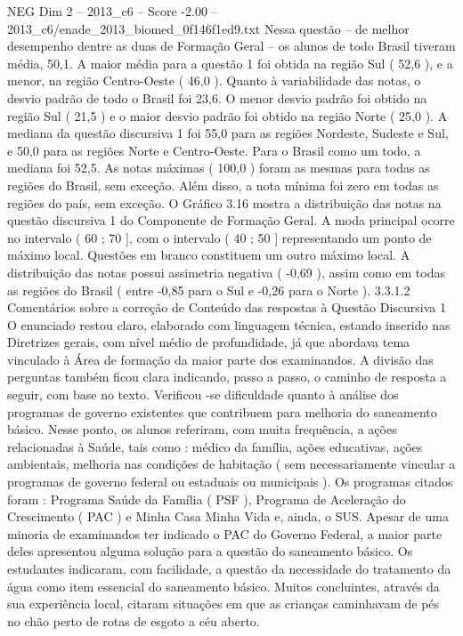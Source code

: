 \begin{textsample}{NEG Dim 2 – 2013\_c6 – Score -2.00 – 2013\_c6/enade\_2013\_biomed\_0f146f1ed9.txt}
Nessa questão – de melhor desempenho dentre as duas de Formação Geral – os alunos de todo Brasil tiveram média, 50,1.
A maior média para a questão 1 foi obtida na região Sul ( 52,6 ), e a menor, na região Centro-Oeste ( 46,0 ).
Quanto à variabilidade das notas, o desvio padrão de todo o Brasil foi 23,6.
O menor desvio padrão foi obtido na região Sul ( 21,5 ) e o maior desvio padrão foi obtido na região Norte ( 25,0 ).
A mediana da questão discursiva 1 foi 55,0 para as regiões Nordeste, Sudeste e Sul, e 50,0 para as regiões Norte e Centro-Oeste.
Para o Brasil como um todo, a mediana foi 52,5.
As notas máximas ( 100,0 ) foram as mesmas para todas as regiões do Brasil, sem exceção.
Além disso, a nota mínima foi zero em todas as regiões do país, sem exceção.
O Gráfico 3.16 mostra a distribuição das notas na questão discursiva 1 do Componente de Formação Geral.
A moda principal ocorre no intervalo ( 60 ; 70 ], com o intervalo ( 40 ; 50 ] representando um ponto de máximo local.
Questões em branco constituem um outro máximo local.
A distribuição das notas possui assimetria negativa ( -0,69 ), assim como em todas as regiões do Brasil ( entre -0,85 para o Sul e -0,26 para o Norte ). 3.3.1.2 Comentários sobre a correção de Conteúdo das respostas à Questão Discursiva 1 O enunciado restou claro, elaborado com linguagem técnica, estando inserido nas Diretrizes gerais, com nível médio de profundidade, já que abordava tema vinculado à Área de formação da maior parte dos examinandos.
A divisão das perguntas também ficou clara indicando, passo a passo, o caminho de resposta a seguir, com base no texto.
Verificou -se dificuldade quanto à análise dos programas de governo existentes que contribuem para melhoria do saneamento básico.
Nesse ponto, os alunos referiram, com muita frequência, a ações relacionadas à Saúde, tais como : médico da família, ações educativas, ações ambientais, melhoria nas condições de habitação ( sem necessariamente vincular a programas de governo federal ou estaduais ou municipais ).
Os programas citados foram : Programa Saúde da Família ( PSF ), Programa de Aceleração do Crescimento ( PAC ) e Minha Casa Minha Vida e, ainda, o SUS.
Apesar de uma minoria de examinandos ter indicado o PAC do Governo Federal, a maior parte deles apresentou alguma solução para a questão do saneamento básico.
Os estudantes indicaram, com facilidade, a questão da necessidade do tratamento da água como item essencial do saneamento básico.
Muitos concluintes, através da sua experiência local, citaram situações em que as crianças caminhavam de pés no chão perto de rotas de esgoto a céu aberto.

\end{textsample}
